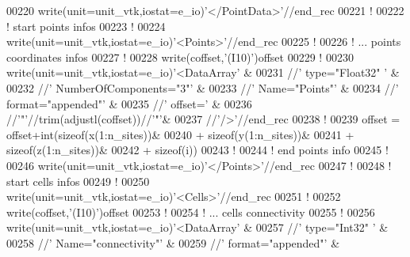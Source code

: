 \begin{DoxyCode}
00220 \textcolor{keyword}{write}(unit=unit\_vtk,iostat=e\_io)\textcolor{stringliteral}{'</PointData>'}//end\_rec
00221 \textcolor{comment}{!}
00222 \textcolor{comment}{! start points infos}
00223 \textcolor{comment}{!}
00224 \textcolor{keyword}{write}(unit=unit\_vtk,iostat=e\_io)\textcolor{stringliteral}{'<Points>'}//end\_rec
00225 \textcolor{comment}{!}
00226 \textcolor{comment}{! ... points coordinates infos}
00227 \textcolor{comment}{!}
00228 \textcolor{keyword}{write}(coffset,\textcolor{stringliteral}{'(I10)'})offset
00229 \textcolor{comment}{!}
00230 \textcolor{keyword}{write}(unit=unit\_vtk,iostat=e\_io)\textcolor{stringliteral}{'<DataArray'}                      &
00231                                 //\textcolor{stringliteral}{' type="Float32" '}              &
00232                                 //\textcolor{stringliteral}{' NumberOfComponents="3"'}       &
00233                                 //\textcolor{stringliteral}{' Name="Points"'}                &
00234                                 //\textcolor{stringliteral}{' format="appended"'}            &
00235                                 //\textcolor{stringliteral}{' offset='}                      &
00236                                 //\textcolor{stringliteral}{'"'}//trim(adjustl(coffset))//\textcolor{stringliteral}{'"'}&
00237                                 //\textcolor{stringliteral}{'/>'}//end\_rec
00238 \textcolor{comment}{!}
00239 offset = offset+int(sizeof(x(1:n\_sites))&
00240                +    sizeof(y(1:n\_sites))&
00241                +    sizeof(z(1:n\_sites))&
00242                +    sizeof(i))
00243 \textcolor{comment}{!}
00244 \textcolor{comment}{! end points info}
00245 \textcolor{comment}{!}
00246 \textcolor{keyword}{write}(unit=unit\_vtk,iostat=e\_io)\textcolor{stringliteral}{'</Points>'}//end\_rec
00247 \textcolor{comment}{!}
00248 \textcolor{comment}{! start cells infos}
00249 \textcolor{comment}{!}
00250 \textcolor{keyword}{write}(unit=unit\_vtk,iostat=e\_io)\textcolor{stringliteral}{'<Cells>'}//end\_rec
00251 \textcolor{comment}{!}
00252 \textcolor{keyword}{write}(coffset,\textcolor{stringliteral}{'(I10)'})offset
00253 \textcolor{comment}{!}
00254 \textcolor{comment}{! ... cells connectivity}
00255 \textcolor{comment}{!}
00256 \textcolor{keyword}{write}(unit=unit\_vtk,iostat=e\_io)\textcolor{stringliteral}{'<DataArray'}                      &
00257                                 //\textcolor{stringliteral}{' type="Int32" '}                &
00258                                 //\textcolor{stringliteral}{' Name="connectivity"'}          &
00259                                 //\textcolor{stringliteral}{' format="appended"'}            &

\end{DoxyCode}
